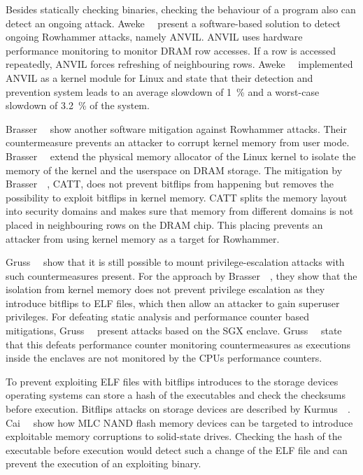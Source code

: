 Besides statically checking binaries, checking the behaviour of a program also
can detect an ongoing attack. Aweke~\etal~\cite{anvil} present a software-based
solution to detect ongoing Rowhammer attacks, namely ANVIL. ANVIL uses hardware
performance monitoring to monitor DRAM row accesses. If a row is accessed
repeatedly, ANVIL forces refreshing of neighbouring rows.
Aweke~\etal~\cite{anvil} implemented ANVIL as a kernel module for Linux and
state that their detection and prevention system leads to an average slowdown of
\SI{1}{\percent} and a worst-case slowdown of \SI{3.2}{\percent} of the system.

Brasser~\etal~\cite{canttouch} show another software mitigation against
Rowhammer attacks. Their countermeasure prevents an attacker to corrupt kernel
memory from user mode. Brasser~\etal~\cite{canttouch} extend the physical memory
allocator of the Linux kernel to isolate the memory of the kernel and the
userspace on DRAM storage. The mitigation by Brasser~\etal~\cite{canttouch},
CATT, does not prevent bitflips from happening but removes the possibility to
exploit bitflips in kernel memory. CATT splits the memory layout into security
domains and makes sure that memory from different domains is not placed in
neighbouring rows on the DRAM chip. This placing prevents an attacker from using
kernel memory as a target for Rowhammer.

Gruss~\etal~\cite{flipinthewall} show that it is still possible to mount
privilege-escalation attacks with such countermeasures present. For the approach
by Brasser~\etal~\cite{canttouch}, they show that the isolation from kernel
memory does not prevent privilege escalation as they introduce bitflips to ELF
files, which then allow an attacker to gain superuser privileges. For defeating
static analysis and performance counter based mitigations,
Gruss~\etal~\cite{flipinthewall} present attacks based on the SGX enclave.
Gruss~\etal~\cite{flipinthewall} state that this defeats performance counter
monitoring countermeasures as executions inside the enclaves are not monitored
by the CPU\textquotesingle s performance counters.

To prevent exploiting ELF files with bitflips introduces to the storage devices
operating systems can store a hash of the executables and check the checksums
before execution. Bitflips attacks on storage devices are described by
Kurmus~\etal~\cite{rowssdhammer}. Cai~\etal~\cite{rownandhammer} show how MLC
NAND flash memory devices can be targeted to introduce exploitable memory
corruptions to solid-state drives. Checking the hash of the executable before
execution would detect such a change of the ELF file and can prevent the
execution of an exploiting binary.

